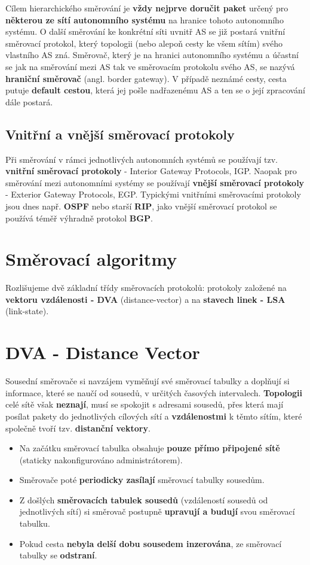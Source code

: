 Cílem hierarchického směrování je \textbf{vždy nejprve doručit paket} určený pro \textbf{některou ze sítí autonomního systému} na hranice tohoto autonomního systému. O další směrování ke konkrétní síti uvnitř AS se již postará vnitřní směrovací protokol, který topologii (nebo alepoň cesty ke všem sítím) svého vlastního AS zná. Směrovač, který je na hranici autonomního systému a účastní se jak na směrování mezi AS tak ve směrovacím protokolu svého AS, se nazývá \textbf{hraniční směrovač} (angl. border gateway). V případě neznámé cesty, cesta putuje \textbf{default cestou}, která jej pošle nadřazenému AS a ten se o její zpracování dále postará.

\subsection{Vnitřní a vnější směrovací protokoly}
Při směrování v rámci jednotlivých autonomních systémů se používají tzv. \textbf{vnitřní směrovací protokoly} - Interior Gateway Protocols, IGP. Naopak pro směrování mezi autonomními systémy se používají \textbf{vnější směrovací protokoly} - Exterior Gateway Protocols, EGP. Typickými vnitřními směrovacími protokoly jsou dnes např. \textbf{OSPF} nebo starší \textbf{RIP}, jako vnější směrovací protokol se používá téměř výhradně protokol \textbf{BGP}.

\section{Směrovací algoritmy}
Rozlišujeme dvě základní třídy směrovacích protokolů: protokoly založené na \textbf{vektoru vzdálenosti - DVA}  (distance-vector) a na \textbf{stavech linek - LSA} (link-state).

\section{DVA - Distance Vector}
Sousední směrovače si navzájem vyměňují své směrovací tabulky a doplňují si informace, které se naučí od sousedů, v určitých časových intervalech. \textbf{Topologii} celé sítě však \textbf{neznají}, musí se spokojit s adresami sousedů, přes která mají posílat pakety do jednotlivých cílových sítí a \textbf{vzdálenostmi} k těmto sítím, které společně tvoří tzv. \textbf{distanční vektory}.

\begin{itemize}
    \item Na začátku směrovací tabulka obsahuje \textbf{pouze přímo připojené sítě} (staticky nakonfigurováno administrátorem).
    \item Směrovače poté \textbf{periodicky zasílají }směrovací tabulky sousedům.
    \item Z došlých \textbf{směrovacích tabulek sousedů} (vzdáleností sousedů od jednotlivých sítí) si směrovač postupně \textbf{upravují a budují} svou směrovací tabulku.
    \item Pokud cesta \textbf{nebyla delší dobu sousedem inzerována}, ze směrovací tabulky se \textbf{odstraní}.
\end{itemize}

